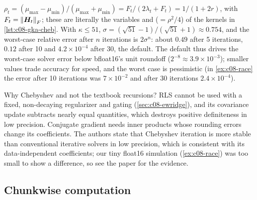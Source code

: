 $\rho_t=(\mu_{\max}-\mu_{\min})/(\mu_{\max}+\mu_{\min})=F_t/(2\lambda_t+F_t)=1/(1+2r)$, with
$F_t=\left\lVert \bm{H}_t\right\rVert_F$; these are literally the variables  and 
($=\rho^2/4$) of the kernels in \cref{lst:c08-gka-cheb}. With $\kappa\le51$,
$\sigma=(\sqrt{51}-1)/(\sqrt{51}+1)\approx0.754$, and the worst-case relative error after $n$
iterations is $2\sigma^n$: about $0.49$ after 5 iterations, $0.12$ after 10 and $4.2\times10^{-4}$
after 30, the default. The default thus drives the worst-case solver error below bfloat16's unit
roundoff ($2^{-8}\approx3.9\times10^{-3}$); smaller  values trade accuracy for
speed, and the worst case is pessimistic (in \cref{ex:c08-race} the error after 10 iterations was
$7\times10^{-2}$ and after 30 iterations $2.4\times10^{-4}$).

Why Chebyshev and not the textbook recursions? RLS cannot be used with a fixed, non-decaying
regularizer and gating (\cref{sec:c08-ewridge}), and its covariance update subtracts nearly equal
quantities, which destroys positive definiteness in low precision. Conjugate gradient needs inner
products whose rounding errors change its coefficients. The authors state that Chebyshev iteration
is more stable than conventional iterative solvers in low precision, which is consistent with its
data-independent coefficients; our tiny float16 simulation (\cref{ex:c08-race}) was too small to
show a difference, so see the paper for the evidence.

\subsection{Chunkwise computation}\label{sec:c08-gka-chunk}

